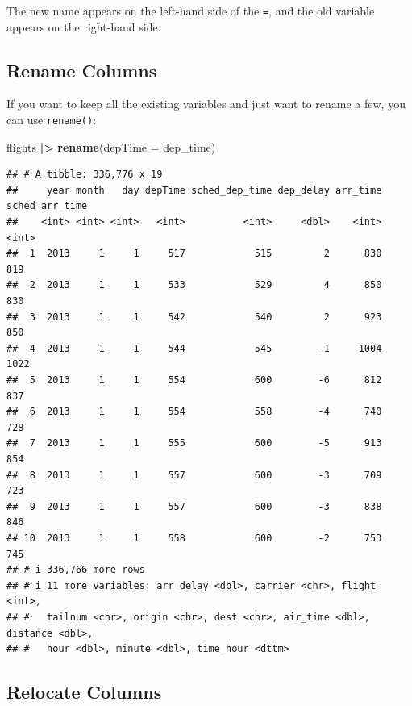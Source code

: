 \documentclass[
]{book}
\newenvironment{Shaded}{\begin{snugshade}}{\end{snugshade}}
\newcommand{\AttributeTok}[1]{\textcolor[rgb]{0.13,0.29,0.53}{#1}}
\newcommand{\FunctionTok}[1]{\textcolor[rgb]{0.13,0.29,0.53}{\textbf{#1}}}
\newcommand{\NormalTok}[1]{#1}
\newcommand{\SpecialCharTok}[1]{\textcolor[rgb]{0.81,0.36,0.00}{\textbf{#1}}}
\theoremstyle{definition}
\theoremstyle{definition}
\theoremstyle{definition}
\theoremstyle{definition}
\theoremstyle{remark}
\begin{document}
The new name appears on the left-hand side of the \texttt{=}, and the old variable appears on the right-hand side.

\hypertarget{rename-columns}{%
\subsection{Rename Columns}\label{rename-columns}}

If you want to keep all the existing variables and just want to rename a few, you can use \texttt{rename()}:

\begin{Shaded}
\begin{Highlighting}[]
\NormalTok{flights }\SpecialCharTok{|\textgreater{}} 
  \FunctionTok{rename}\NormalTok{(}\AttributeTok{depTime =}\NormalTok{ dep\_time)}
\end{Highlighting}
\end{Shaded}

\begin{verbatim}
## # A tibble: 336,776 x 19
##     year month   day depTime sched_dep_time dep_delay arr_time sched_arr_time
##    <int> <int> <int>   <int>          <int>     <dbl>    <int>          <int>
##  1  2013     1     1     517            515         2      830            819
##  2  2013     1     1     533            529         4      850            830
##  3  2013     1     1     542            540         2      923            850
##  4  2013     1     1     544            545        -1     1004           1022
##  5  2013     1     1     554            600        -6      812            837
##  6  2013     1     1     554            558        -4      740            728
##  7  2013     1     1     555            600        -5      913            854
##  8  2013     1     1     557            600        -3      709            723
##  9  2013     1     1     557            600        -3      838            846
## 10  2013     1     1     558            600        -2      753            745
## # i 336,766 more rows
## # i 11 more variables: arr_delay <dbl>, carrier <chr>, flight <int>,
## #   tailnum <chr>, origin <chr>, dest <chr>, air_time <dbl>, distance <dbl>,
## #   hour <dbl>, minute <dbl>, time_hour <dttm>
\end{verbatim}

\hypertarget{relocate-columns}{%
\subsection{Relocate Columns}\label{relocate-columns}}
\end{document}
